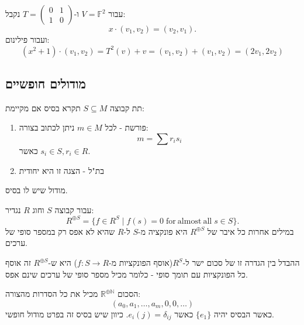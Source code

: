\documentclass{tstextbook}
\begin{document}
\begin{example}
עבור \(V=\mathbb{F}^{2}\) ו-\(T=\begin{pmatrix}0&1\\1& 0\end{pmatrix}\) נקבל:
$$x\cdot\left(v_{1},v_{2}\right)=(v_{2},v_{1}).$$
ועבור פילינום:
$$\left(x^{2}+1\right)\cdot\left(v_{1},v_{2}\right)=T^{2}(v)+v=\left(v_{1},v_{2}\right)+\left(v_{1},v_{2}\right)=\left(2v_{1},2v_{2}\right)$$

\end{example}
\subsection{מודולים חופשיים}

\begin{definition}[בסיס]
תת קבוצה \(S\subseteq M\) תקרא בסיס אם מקיימת:

  \begin{enumerate}
    \item פורשת - לכל \(m \in M\) ניתן לכתוב בצורה: 
$$m=\sum r_{i}s_{i}$$
כאשר \(s_{i}\in S,r_{i}\in R\).


    \item בת"ל - הצגה זו היא יחודית 


  \end{enumerate}
\end{definition}
\begin{definition}
מודול שיש לו בסיס.

\end{definition}
\begin{definition}
עבור קבוצה \(S\) וחוג \(R\) נגדיר:
$$R^{\oplus S}=\{f\in R^{S}\mid f(s)=0\;{\mathrm{for~almost~all}}\;s\in S\}.$$
במילים אחרות כל איבר של \(R^{\oplus S}\) היא פונקציה מ-\(S\) ל-\(R\) שהיא לא אפס רק במספר סופי של ערכים.

\end{definition}
\begin{remark}
ההבדל בין הגדרה זו של סכום ישר ל-\(R^{S}\)(אוסף הפונקציות מ-\(f:S\to R\)) היא ש-\(R^{\oplus S}\) זה אוסף כל הפונקציות עם תומך סופי - כלומר מכיל מספר סופי של ערכים שינם אפס.

\end{remark}
\begin{example}
הסכום \(\mathbb{R}^{\oplus \mathbb{N}}\) מכיל את כל הסדרות מהצורה:
$$(a_{0},a_{1},\dots,a_{m}, 0,0,\dots)$$
כאשר הבסיס יהיה \(\{ e_{1} \}\) כאשר \(e_{i}(j)=\delta_{ij}\). כיוון שיש בסיס זה בפרט מודול חופשי.

\end{example}
\end{document}
